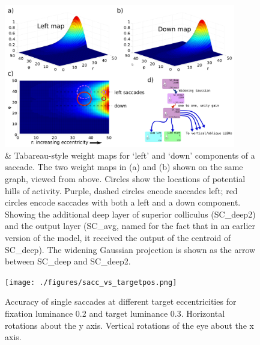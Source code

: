 \documentclass{frontiersSCNS}
\begin{document}
\begin{figure}[!ht]
\begin{center}
\includegraphics[width=0.9\textwidth]{./figures/scdeep_plus.png}
\end{center}
\caption{  \&  Tabareau-style weight maps for `left' and `down' components
of a saccade.  The two weight maps in (a) and (b) shown on the same
graph, viewed from above. Circles show the locations of potential
hills of activity. Purple, dashed circles encode saccades left;
red circles encode saccades with both a left and a down component. 
Showing the additional deep layer of superior colliculus (SC\_deep2)
and the output layer (SC\_avg, named for the fact that in an earlier
version of the model, it received the output of the centroid of
SC\_deep).  The widening Gaussian projection is shown as the arrow
between SC\_deep and SC\_deep2.}
\label{fig:scdeep}
\end{figure}

\begin{figure}[!ht]
\begin{center}
\texttt{[image: ./figures/sacc\_vs\_targetpos.png]}
\end{center}
\caption{ Accuracy of single saccades at different target eccentricities for fixation luminance
0.2 and target luminance 0.3.  Horizontal rotations about the
y axis.  Vertical rotations of the eye about the x axis.}
\label{fig:saccvstarg}
\end{figure}
\end{document}
